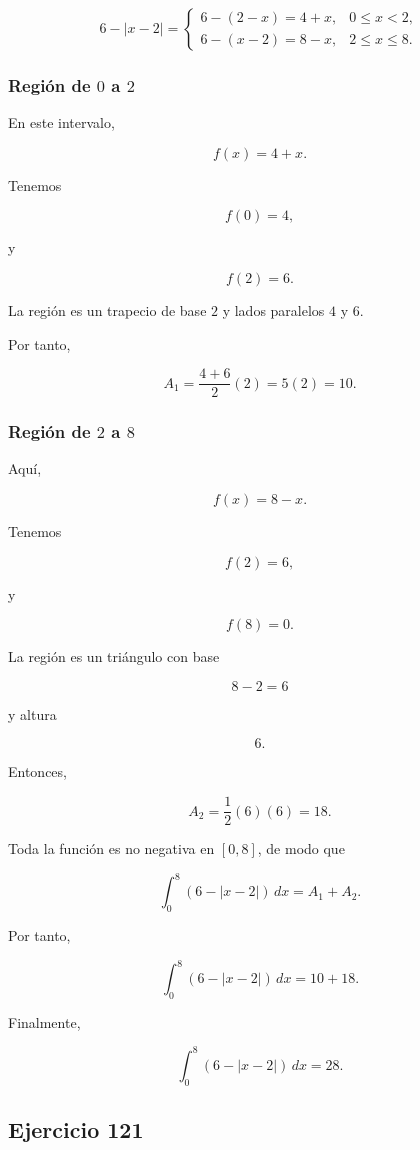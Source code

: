 \documentclass[12pt]{article}
\begin{document}
\[
6-|x-2|
=
\begin{cases}
6-(2-x)=4+x, & 0\leq x<2,\\
6-(x-2)=8-x, & 2\leq x\leq8.
\end{cases}
\]

\subsubsection*{Región de \(0\) a \(2\)}

En este intervalo,

\[
f(x)=4+x.
\]

Tenemos

\[
f(0)=4,
\]

y

\[
f(2)=6.
\]

La región es un trapecio de base \(2\) y lados paralelos \(4\) y \(6\).

Por tanto,

\[
A_1
=
\frac{4+6}{2}(2)
=
5(2)
=
10.
\]

\subsubsection*{Región de \(2\) a \(8\)}

Aquí,

\[
f(x)=8-x.
\]

Tenemos

\[
f(2)=6,
\]

y

\[
f(8)=0.
\]

La región es un triángulo con base

\[
8-2=6
\]

y altura

\[
6.
\]

Entonces,

\[
A_2
=
\frac12(6)(6)
=
18.
\]

Toda la función es no negativa en \([0,8]\), de modo que

\[
\int_0^8(6-|x-2|)\,dx
=
A_1+A_2.
\]

Por tanto,

\[
\int_0^8(6-|x-2|)\,dx
=
10+18.
\]

Finalmente,

\[
\boxed{
\int_0^8(6-|x-2|)\,dx=28
}.
\]

\subsection*{Ejercicio 121}
\end{document}
